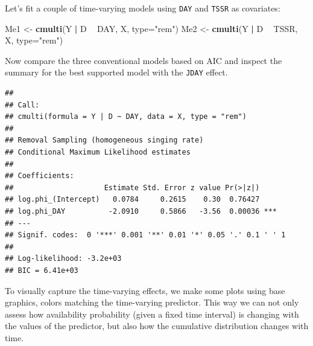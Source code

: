 \documentclass[12pt,]{book}
\newenvironment{Shaded}{\begin{snugshade}}{\end{snugshade}}
\newcommand{\DataTypeTok}[1]{\textcolor[rgb]{0.13,0.29,0.53}{#1}}
\newcommand{\DecValTok}[1]{\textcolor[rgb]{0.00,0.00,0.81}{#1}}
\newcommand{\KeywordTok}[1]{\textcolor[rgb]{0.13,0.29,0.53}{\textbf{#1}}}
\newcommand{\NormalTok}[1]{#1}
\newcommand{\OperatorTok}[1]{\textcolor[rgb]{0.81,0.36,0.00}{\textbf{#1}}}
\newcommand{\StringTok}[1]{\textcolor[rgb]{0.31,0.60,0.02}{#1}}
\begin{document}
Let's fit a couple of time-varying models using \texttt{DAY} and \texttt{TSSR} as covariates:

\begin{Shaded}
\begin{Highlighting}[]
\NormalTok{Me1 <-}\StringTok{ }\KeywordTok{cmulti}\NormalTok{(Y }\OperatorTok{|}\StringTok{ }\NormalTok{D }\OperatorTok{~}\StringTok{ }\NormalTok{DAY, X, }\DataTypeTok{type=}\StringTok{"rem"}\NormalTok{)}
\NormalTok{Me2 <-}\StringTok{ }\KeywordTok{cmulti}\NormalTok{(Y }\OperatorTok{|}\StringTok{ }\NormalTok{D }\OperatorTok{~}\StringTok{ }\NormalTok{TSSR, X, }\DataTypeTok{type=}\StringTok{"rem"}\NormalTok{)}
\end{Highlighting}
\end{Shaded}

Now compare the three conventional models based on AIC and inspect the summary for the best supported model with the \texttt{JDAY} effect.

\begin{Shaded}
\end{Shaded}

\begin{verbatim}
## 
## Call:
## cmulti(formula = Y | D ~ DAY, data = X, type = "rem")
## 
## Removal Sampling (homogeneous singing rate)
## Conditional Maximum Likelihood estimates
## 
## Coefficients:
##                     Estimate Std. Error z value Pr(>|z|)    
## log.phi_(Intercept)   0.0784     0.2615    0.30  0.76427    
## log.phi_DAY          -2.0910     0.5866   -3.56  0.00036 ***
## ---
## Signif. codes:  0 '***' 0.001 '**' 0.01 '*' 0.05 '.' 0.1 ' ' 1 
## 
## Log-likelihood: -3.2e+03 
## BIC = 6.41e+03
\end{verbatim}

To visually capture the time-varying effects, we make some plots using base graphics,
colors matching the time-varying predictor. This way we can not only assess how availability
probability (given a fixed time interval) is changing with the values of the predictor,
but also how the cumulative distribution changes with time.
\end{document}

